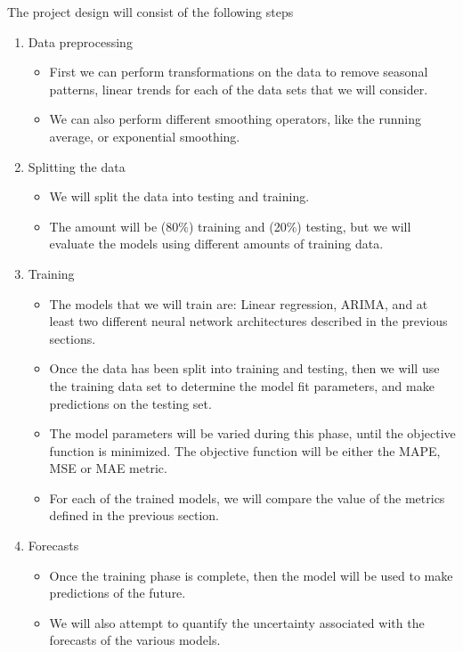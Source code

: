 \documentclass[10pt,a4paper]{article}
\begin{document}
The project design will consist of the following steps

\begin{enumerate}
\item Data preprocessing
\begin{itemize}
\item First we can perform transformations on the data to remove seasonal patterns, linear trends for each of the data sets that we will consider.
\item We can also perform different smoothing operators, like the running average, or exponential smoothing.
\end{itemize}

\item Splitting the data
\begin{itemize}
\item We will split the data into testing and training.
\item The amount will be (80$\%$) training and (20$\%$) testing, but we will evaluate the models using different amounts of training data.
\end{itemize}

\item Training
\begin{itemize}
\item The models that we will train are: Linear regression, ARIMA, and at least two different neural network architectures described in the previous sections.
\item Once the data has been split into training and testing, then we will use the training data set to determine the model fit parameters, and make predictions on the testing set.
\item The model parameters will be varied during this phase, until the objective function is minimized. The objective function will be either the MAPE, MSE or MAE metric.
\item For each of the trained models, we will compare the value of the metrics defined in the previous section.
\end{itemize}



\item Forecasts
\begin{itemize}
\item Once the training phase is complete, then the model will be used to make predictions of the future.
\item We will also attempt to quantify the uncertainty associated with the forecasts of the various models. 
\end{itemize}


\end{enumerate}
\end{document}
